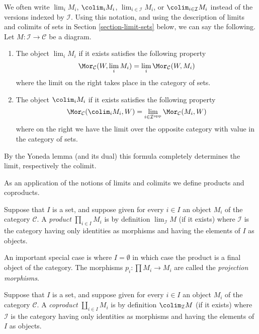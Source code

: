 \begin{remark}
\label{remark-limit-colim}
We often write $\lim_i M_i$, $\colim_i M_i$,
$\lim_{i\in \mathcal{I}} M_i$, or $\colim_{i\in \mathcal{I}} M_i$
instead of the versions indexed by $\mathcal{I}$.
Using this notation, and using the description of
limits and colimits of sets in Section \ref{section-limit-sets}
below, we can say the following.
Let $M : \mathcal{I} \to \mathcal{C}$ be a diagram.
\begin{enumerate}
\item The object $\lim_i M_i$ if it exists satisfies the following property
$$
\Mor_\mathcal{C}(W, \lim_i M_i)
=
\lim_i \Mor_\mathcal{C}(W, M_i)
$$
where the limit on the right takes place in the category of sets.
\item The object $\colim_i M_i$ if it
exists satisfies the following property
$$
\Mor_\mathcal{C}(\colim_i M_i, W)
=
\lim_{i\in \mathcal{I}^\text{opp}} \Mor_\mathcal{C}(M_i, W)
$$
where on the right we have the limit over the opposite category
with value in the category of sets.
\end{enumerate}
By the Yoneda lemma (and its dual) this formula completely determines the
limit, respectively the colimit.
\end{remark}

\noindent
As an application of the notions of limits and colimits
we define products and coproducts.

\begin{definition}
\label{definition-product}
Suppose that $I$ is a set, and suppose given for every $i \in I$ an
object $M_i$ of the category $\mathcal{C}$. A {\it product}
$\prod_{i\in I} M_i$ is by definition $\lim_\mathcal{I} M$
(if it exists)
where $\mathcal{I}$ is the category having only identities as
morphisms and having the elements of $I$ as objects.
\end{definition}

\noindent
An important special case is where $I = \emptyset$ in which case the
product is a final object of the category.
The morphisms $p_i : \prod M_i \to M_i$ are called the
{\it projection morphisms}.

\begin{definition}
\label{definition-coproduct}
Suppose that $I$ is a set, and suppose given for every $i \in I$ an
object $M_i$ of the category $\mathcal{C}$. A {\it coproduct}
$\coprod_{i\in I} M_i$ is by definition $\colim_\mathcal{I} M$
(if it exists) where $\mathcal{I}$ is the category having only
identities as morphisms and having the elements of $I$ as objects.
\end{definition}

